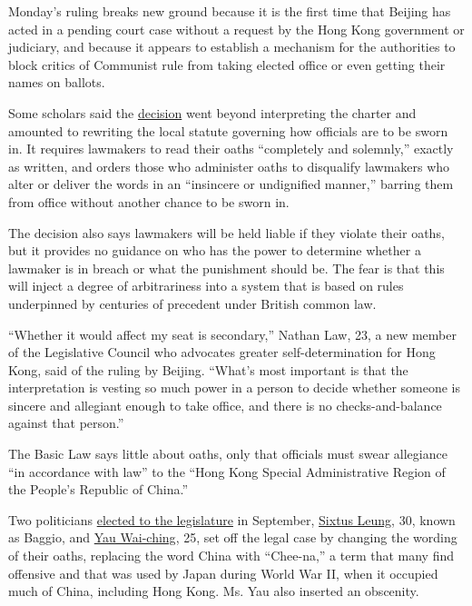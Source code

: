 Monday's ruling breaks new ground because it is the first time that
Beijing has acted in a pending court case without a request by the Hong
Kong government or judiciary, and because it appears to establish a
mechanism for the authorities to block critics of Communist rule from
taking elected office or even getting their names on ballots.

Some scholars said the
\href{http://news.xinhuanet.com/english/2016-11/07/c_135811504.htm}{decision}
went beyond interpreting the charter and amounted to rewriting the local
statute governing how officials are to be sworn in. It requires
lawmakers to read their oaths ``completely and solemnly,'' exactly as
written, and orders those who administer oaths to disqualify lawmakers
who alter or deliver the words in an ``insincere or undignified
manner,'' barring them from office without another chance to be sworn
in.

The decision also says lawmakers will be held liable if they violate
their oaths, but it provides no guidance on who has the power to
determine whether a lawmaker is in breach or what the punishment should
be. The fear is that this will inject a degree of arbitrariness into a
system that is based on rules underpinned by centuries of precedent
under British common law.

``Whether it would affect my seat is secondary,'' Nathan Law, 23, a new
member of the Legislative Council who advocates greater
self-determination for Hong Kong, said of the ruling by Beijing.
``What's most important is that the interpretation is vesting so much
power in a person to decide whether someone is sincere and allegiant
enough to take office, and there is no checks-and-balance against that
person.''

The Basic Law says little about oaths, only that officials must swear
allegiance ``in accordance with law'' to the ``Hong Kong Special
Administrative Region of the People's Republic of China.''

Two politicians
\href{http://www.nytimes3xbfgragh.onion/2016/09/05/world/asia/hong-kong-election.html}{elected
to the legislature} in September,
\href{http://www.nytimes3xbfgragh.onion/2016/09/02/world/asia/hong-kong-elections-legco.html}{Sixtus
Leung}, 30, known as Baggio, and
\href{http://www.nytimes3xbfgragh.onion/2016/11/05/world/asia/hong-kong-yau-wai-ching.html}{Yau
Wai-ching}, 25, set off the legal case by changing the wording of their
oaths, replacing the word China with ``Chee-na,'' a term that many find
offensive and that was used by Japan during World War II, when it
occupied much of China, including Hong Kong. Ms. Yau also inserted an
obscenity.

